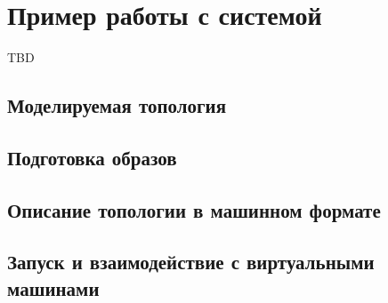 \section{Пример работы с системой}
TBD

\subsection{Моделируемая топология}

\subsection{Подготовка образов}

\subsection{Описание топологии в машинном формате}

\subsection{Запуск и взаимодействие с виртуальными машинами}



